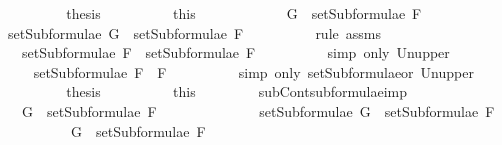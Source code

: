 \begin{isabellebody}
\ \ \ \ \ \ \isamarkupfalse%
\ \isamarkupfalse%
\ {\isacharquery}thesis\isanewline
\ \ \ \ \ \ \ \ \isamarkupfalse%
\ this\isanewline
\ \ \ \ \isamarkupfalse%
\isanewline
\ \ \ \ \ \ \isamarkupfalse%
\ {\isachardoublequoteopen}G\ {\isasymin}\ setSubformulae\ F{}{\isachardoublequoteclose}\isanewline
\ \ \ \ \ \ \isamarkupfalse%
\ \isamarkupfalse%
\ {\isachardoublequoteopen}setSubformulae\ G\ {\isasymsubseteq}\ setSubformulae\ F{}{\isachardoublequoteclose}\isanewline
\ \ \ \ \ \ \ \ \isamarkupfalse%
\ {\isacharparenleft}rule\ assms{\isacharparenleft}{}{\isacharparenright}{\isacharparenright}\isanewline
\ \ \ \ \ \ \isamarkupfalse%
\ \isamarkupfalse%
\ {\isachardoublequoteopen}{\isasymdots}\ {\isasymsubseteq}\ setSubformulae\ F{}\ {\isasymunion}\ setSubformulae\ F{}{\isachardoublequoteclose}\isanewline
\ \ \ \ \ \ \ \ \isamarkupfalse%
\ {\isacharparenleft}simp\ only{\isacharcolon}\ Un{\isacharunderscore}upper{}{\isacharparenright}\isanewline
\ \ \ \ \ \ \isamarkupfalse%
\ \isamarkupfalse%
\ {\isachardoublequoteopen}{\isasymdots}\ {\isasymsubseteq}\ setSubformulae\ {\isacharparenleft}F{}\ \isactrlbold {\isasymor}\ F{}{\isacharparenright}{\isachardoublequoteclose}\isanewline
\ \ \ \ \ \ \ \ \isamarkupfalse%
\ {\isacharparenleft}simp\ only{\isacharcolon}\ setSubformulae{\isacharunderscore}or\ Un{\isacharunderscore}upper{}{\isacharparenright}\isanewline
\ \ \ \ \ \ \isamarkupfalse%
\ \isamarkupfalse%
\ {\isacharquery}thesis\isanewline
\ \ \ \ \ \ \ \ \isamarkupfalse%
\ this\isanewline
\ \ \ \ \isamarkupfalse%
\isanewline
\ \ \isamarkupfalse%
\isanewline
{}\isamarkupfalse%
%
\endisatagproof
{\isafoldproof}%
%
\isadelimproof
\isanewline
%
\endisadelimproof
\isanewline
{}\isamarkupfalse%
\ subContsubformulae{\isacharunderscore}imp{\isacharcolon}\isanewline
\ \ \ {\isachardoublequoteopen}G\ {\isasymin}\ setSubformulae\ F{}\ \isanewline
\ \ \ \ \ \ \ \ \ \ \ \ {\isasymLongrightarrow}\ setSubformulae\ G\ {\isasymsubseteq}\ setSubformulae\ F{}{\isachardoublequoteclose}\isanewline
\ \ \ \ \ \ \ \ \ \ {\isachardoublequoteopen}G\ {\isasymin}\ setSubformulae\ F{}\ \isanewline

\end{isabellebody}
